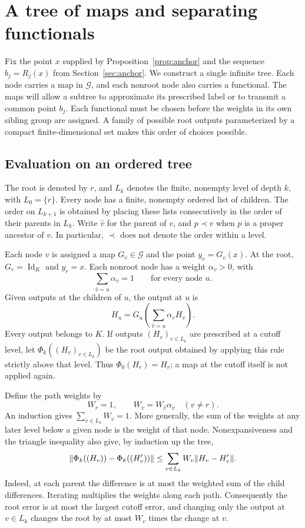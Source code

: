 \section{A tree of maps and separating functionals}
\label{sec:tree}

Fix the point $x$ supplied by Proposition~\ref{prop:anchor} and the
sequence $b_j=R_j(x)$ from Section~\ref{sec:anchor}.  We construct a
single infinite tree.  Each node carries a map in $\mathcal G$, and
each nonroot node also carries a functional.  The maps will allow a
subtree to approximate its prescribed label or to transmit a common
point $b_j$.  Each functional must be chosen before the weights in its own
sibling group are assigned.  A family of possible root outputs parameterized
by a compact finite-dimensional set makes this order of choices possible.

\subsection{Evaluation on an ordered tree}

The root is denoted by $r$, and $L_k$ denotes the finite, nonempty
level of depth $k$, with $L_0=\{r\}$.  Every node has a finite,
nonempty ordered list of children.  The order on $L_{k+1}$ is obtained
by placing these lists consecutively in the order of their parents
in $L_k$.  Write $\widehat v$ for the parent of $v$, and $p\prec v$
when $p$ is a proper ancestor of $v$.  In particular, $\prec$ does
not denote the order within a level.

Each node $v$ is assigned a map $G_v\in\mathcal G$ and the point
$y_v=G_v(x)$.  At the root, $G_r=\operatorname{Id}_K$ and $y_r=x$.
Each nonroot node has a weight $\alpha_v>0$, with
\[
  \sum_{\widehat v=u}\alpha_v=1
  \qquad\text{for every node }u.
\]
Given outputs at the children of $u$, the output at $u$ is
\begin{equation}
  H_u=G_u\left(\sum_{\widehat v=u}\alpha_v H_v\right).
  \label{eq:tree-rule}
\end{equation}
Every output belongs to $K$.  If outputs $(H_v)_{v\in L_k}$ are
prescribed at a cutoff level, let $\Phi_k((H_v)_{v\in L_k})$ be the
root output obtained by applying this rule strictly above that level.
Thus $\Phi_0(H_r)=H_r$; a map at the cutoff itself is not applied
again.

Define the path weights by
\[
  W_r=1,\qquad W_v=W_{\widehat v}\alpha_v\quad(v\ne r).
\]
An induction gives $\sum_{v\in L_k}W_v=1$.  More generally, the
sum of the weights at any later level below a given node is the
weight of that node.  Nonexpansiveness and the triangle inequality
also give, by induction up the tree,
\begin{equation}
 \lVert\Phi_k((H_v)) - \Phi_k((H'_v))\rVert
 \le \sum_{v\in L_k}W_v\lVert H_v-H'_v\rVert.
 \label{eq:tree-sensitivity}
\end{equation}
Indeed, at each parent the difference is at most the weighted sum of
the child differences.  Iterating multiplies the weights along each
path.  Consequently the root error is at most the largest cutoff
error, and changing only the output at $v\in L_k$ changes the root
by at most $W_v$ times the change at $v$.

